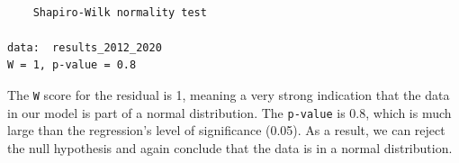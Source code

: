 \documentclass[
  letterpaper,
]{krantz}
\newenvironment{Shaded}{\begin{snugshade}}{\end{snugshade}}
\newcommand{\AttributeTok}[1]{\textcolor[rgb]{0.40,0.45,0.13}{#1}}
\newcommand{\ConstantTok}[1]{\textcolor[rgb]{0.56,0.35,0.01}{#1}}
\newcommand{\FunctionTok}[1]{\textcolor[rgb]{0.28,0.35,0.67}{#1}}
\newcommand{\NormalTok}[1]{\textcolor[rgb]{0.00,0.23,0.31}{#1}}
\newcommand{\OtherTok}[1]{\textcolor[rgb]{0.00,0.23,0.31}{#1}}
\newcommand{\SpecialCharTok}[1]{\textcolor[rgb]{0.37,0.37,0.37}{#1}}
\newcommand{\StringTok}[1]{\textcolor[rgb]{0.13,0.47,0.30}{#1}}
\begin{document}
\begin{tcolorbox}
\begin{verbatim}

    Shapiro-Wilk normality test

data:  results_2012_2020
W = 1, p-value = 0.8
\end{verbatim}

The \texttt{W} score for the residual is 1, meaning a very strong
indication that the data in our model is part of a normal distribution.
The \texttt{p-value} is 0.8, which is much large than the regression's
level of significance (0.05). As a result, we can reject the null
hypothesis and again conclude that the data is in a normal distribution.

\end{tcolorbox}

\begin{Shaded}
\end{Shaded}
\end{document}
